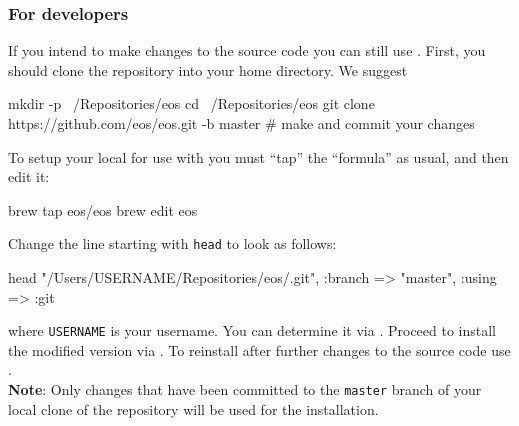 \subsubsection{For developers}
If you intend to make changes to the \EOS source code you can still use .
First, you should clone the \EOS repository into your home directory. We suggest
\begin{commandline}
mkdir -p ~/Repositories/eos
cd ~/Repositories/eos
git clone https://github.com/eos/eos.git -b master
# make and commit your changes
\end{commandline}
To setup your local for use with  you must ``tap'' the \EOS ``formula'' as usual, and then edit it:
\begin{commandline}
brew tap eos/eos
brew edit eos
\end{commandline}
Change the line starting with \texttt{head} to look as follows:
\begin{file}
  head "/Users/USERNAME/Repositories/eos/.git", :branch => "master", :using => :git
\end{file}
where \texttt{USERNAME} is your username. You can determine it via .
Proceed to install the modified \EOS version via .
To reinstall \EOS after further changes to the source code use
.\\
\textbf{Note}: Only changes that have been committed to the \texttt{master} branch of your local clone of the \EOS repository
will be used for the installation.
